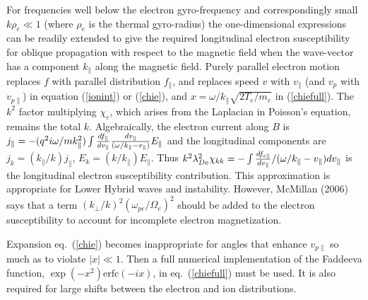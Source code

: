 \documentclass[12pt]{article}
\begin{document}
For frequencies well below the electron gyro-frequency and
correspondingly small $k \rho_e \ll 1$ (where $\rho_e$ is the thermal
gyro-radius) the one-dimensional expressions can be readily extended
to give the required longitudinal electron susceptibility for oblique
propagation with respect to the magnetic field when the wave-vector
has a component $k_\parallel$ along the magnetic field. Purely
parallel electron motion replaces $f$ with parallel distribution
$f_\parallel$, and replaces speed $v$ with $v_{\parallel}$ (and $v_p$
with $v_{p\parallel}$) in equation (\ref{ionint}) or (\ref{chie}), and
$x=\omega/k_\parallel\sqrt{2T_e/m_e}$ in (\ref{chiefull}). The $k^2$
factor multiplying $\chi_e$, which arises from the Laplacian in
Poisson's equation, remains the total $k$. {Algebraically, the
  electron current along $B$ is
  $j_\parallel = -(q^2i\omega/mk_\parallel^2)\int {df_\parallel\over
    dv_\parallel}{ dv_\parallel\over(\omega/k_\parallel -
    v_\parallel)} E_\parallel$ and the longitudinal components are
  $j_k=(k_\parallel/k) j_\parallel$, $E_k=(k/k_\parallel)E_\parallel$.
  Thus
  $k^2\lambda_{De}^2\chi_{kk}= -\int {df_{e\parallel}\over
    dv_\parallel}/(\omega/k_\parallel - v_\parallel) dv_\parallel$ is
  the longitudinal electron susceptibility contribution.}  This
approximation is appropriate for Lower Hybrid waves and
instability. However, McMillan (2006) says that a term
$(k_\perp/k)^2(\omega_{pe}/\Omega_e)^2$ should be added to the
electron susceptibility to account for incomplete electron
magnetization.


Expansion eq.\ (\ref{chie}) becomes inappropriate for angles that
enhance $v_{p\parallel}$ so much as to violate $|x|\ll 1$. Then a full
numerical implementation of the Faddeeva function,
$\exp(-x^2)\mbox{erfc}(-ix)$, in eq.\ (\ref{chiefull}) must be
used. It is also required for large shifts between the electron and
ion distributions.

\end{document}
